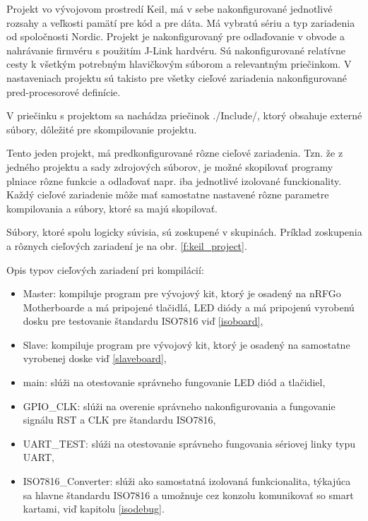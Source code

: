 \documentclass[12pt,a4wide,oneside,openright]{report}
\begin{document}
	Projekt vo vývojovom prostredí Keil, má v sebe nakonfigurované jednotlivé rozsahy a veľkosti pamätí pre kód a pre dáta. Má vybratú sériu a typ zariadenia od spoločnosti Nordic. Projekt je nakonfigurovaný pre odlaďovanie v obvode a nahrávanie firmvéru s použitím J-Link hardvéru.
	Sú nakonfigurované relatívne cesty k všetkým potrebným hlavičkovým súborom a relevantným priečinkom. V nastaveniach projektu sú takisto pre všetky cieľové zariadenia nakonfigurované pred-procesorové definície.
	
	V priečinku s projektom sa nachádza priečinok ./Include/, ktorý obsahuje externé súbory, dôležité pre skompilovanie projektu.
	
	Tento jeden projekt, má predkonfigurované rôzne cieľové zariadenia. Tzn. že z jedného projektu a sady zdrojových súborov, je možné skopilovať programy plniace rôzne funkcie a odlaďovať napr. iba jednotlivé izolované funckionality. 
	Každý cieľové zariadenie môže mať samostatne nastavené rôzne parametre kompilovania a súbory, ktoré sa majú skopilovať.

	
	Súbory, ktoré spolu logicky súvisia, sú zoskupené v skupinách. Príklad zoskupenia a rôznych cieľových zariadení je na obr. \ref{f:keil_project}.
	
	Opis typov cieľových zariadení pri kompilácií:
		\singlespacing
	\begin{itemize}
		\item Master: kompiluje program pre vývojový kit, ktorý je osadený na nRFGo Motherboarde a má pripojené tlačidlá, LED diódy a má pripojenú vyrobenú dosku pre testovanie štandardu ISO7816 viď \ref{isoboard},
		\item Slave: kompiluje program pre vývojový kit, ktorý je osadený na samostatne vyrobenej doske viď \ref{slaveboard},
		\item main: slúži na otestovanie správneho fungovanie LED diód a tlačidiel,
		\item GPIO\_CLK: slúži na overenie správneho nakonfigurovania a fungovanie signálu RST a CLK pre štandardu ISO7816,
		\item UART\_TEST: slúži na otestovanie správneho fungovania sériovej linky typu UART,
		\item ISO7816\_Converter: slúži ako samostatná izolovaná funkcionalita, týkajúca sa hlavne štandardu ISO7816 a umožnuje cez konzolu komunikovať so smart kartami, viď kapitolu \ref{isodebug}.
	\end{itemize}
		\onehalfspacing
	
\end{document}
